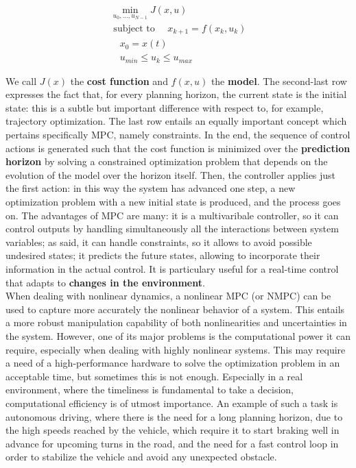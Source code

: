 \documentclass[a4paper, onecolumn, 11pt]{article}
\begin{document}
\begin{equation}
\begin{aligned}
    \min_{u_0,...,u_{N-1}}{J(x,u)} \\
    \text{ subject to }
        \quad x_{k+1} = f(x_k,u_k) \\
        \quad x_0 = x(t) \\
        \quad u_{min} \leq u_k \leq u_{max}
\end{aligned}
\end{equation}

We call $J(x)$ the \textbf{cost function} and $f(x,u)$ the \textbf{model}. The
second-last row expresses the fact that, for every planning horizon, the current
state is the initial state: this is a subtle but important difference with
respect to, for example, trajectory optimization. The last row entails an
equally important concept which pertains specifically MPC, namely constraints.
In the end, the sequence of control actions is generated such that the cost
function is minimized over the \textbf{prediction horizon} by solving a
constrained optimization problem that depends on the evolution of the model over
the horizon itself. Then, the controller applies just the first action: in this
way the system has advanced one step, a new optimization problem with a new
initial state is produced, and the process goes on. The advantages of MPC are
many: it is a multivaribale controller, so it can control outputs by handling
simultaneously all the interactions between system variables; as said, it can
handle constraints, so it allows to avoid possible undesired states; it predicts
the future states, allowing to incorporate their information in the actual
control. It is particulary useful for a real-time control that adapts to
\textbf{changes in the environment}.\\
When dealing with nonlinear dynamics, a nonlinear MPC (or NMPC) can be used to
capture more accurately the nonlinear behavior of a system. This entails a more
robust manipulation capability of both nonlinearities and uncertainties in the
system. However, one of its major problems is the computational power it can
require, especially when dealing with highly nonlinear systems. This may require
a need of a high-performance hardware to solve the optimization problem in an
acceptable time, but sometimes this is not enough. Especially in a real
environment, where the timeliness is fundamental to take a decision,
computational efficiency is of utmost importance. An example of such a task is
autonomous driving, where there is the need for a long planning horizon, due to
the high speeds reached by the vehicle, which require it to start braking well
in advance for upcoming turns in the road, and the need for a fast control loop
in order to stabilize the vehicle and avoid any unexpected obstacle.
\end{document}
